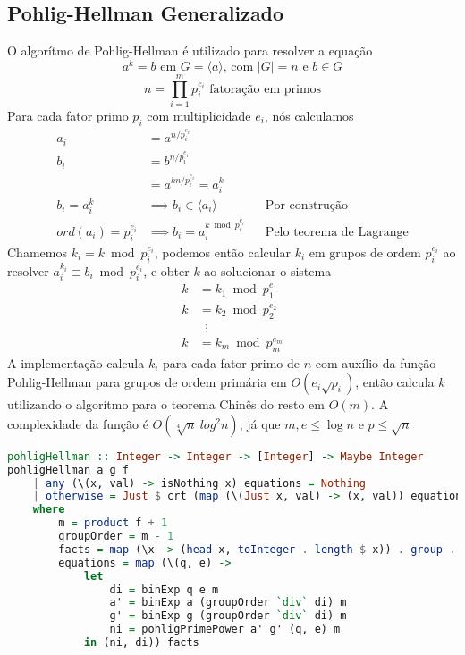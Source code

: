 \documentclass{article}
\begin{document}
\subsection{Pohlig-Hellman Generalizado}
O algorítmo de Pohlig-Hellman é utilizado para resolver a equação
$$ a^k = b \text{ em } G = \langle a \rangle\text{, com }|G| = n\text{ e }b \in G$$
$$ n = \prod_{i=1}^{m}p_i^{e_i} \text{ fatoração em primos} $$
Para cada fator primo $p_i$ com multiplicidade $e_i$, nós calculamos
\begin{align*}
    a_i &= a^{n/p_i^{e_i}}\\
    b_i &= b^{n/p_i^{e_i}}\\
        &= a^{k n/p_i^{e_i}} = a_i^k\\
    b_i = a_i^k &\implies b_i \in \langle a_i \rangle            &&\text{Por construção}\\
    ord(a_i) = p_i^{e_i} &\implies b_i = a_i^{k \bmod p_i^{e_i}} &&\text{Pelo teorema de Lagrange}
\end{align*}
Chamemos $ k_i = k \bmod p_i^{e_i} $, podemos então calcular $k_i$ em grupos de ordem $p_i^{e_i}$ ao resolver $a_i^{k_i} \equiv b_i \bmod p_i^{e_i}$, e obter $k$ ao solucionar o sistema
\begin{align*}
    k &= k_1 \bmod p_1^{e_1} \\
    k &= k_2 \bmod p_2^{e_2} \\
    &\;\;\vdots \\
    k &= k_m \bmod p_m^{e_m}
\end{align*}
A implementação calcula $k_i$ para cada fator primo de $n$ com auxílio da função Pohlig-Hellman para grupos de ordem primária em $O(e_i\sqrt{p_i})$, então calcula $k$ utilizando o algorítmo para o teorema Chinês do resto em $O(m)$.
A complexidade da função é $O(\sqrt[4]{n}\ log^2{n})$, já que $m, e \leq \log{n}$ e $p \leq \sqrt{n}$

\noindent\hspace{0.03\linewidth}
\begin{minipage}{.9\linewidth}
\begin{lstlisting}[language=haskell,caption=Pohlig Hellman]
pohligHellman :: Integer -> Integer -> [Integer] -> Maybe Integer
pohligHellman a g f
    | any (\(x, val) -> isNothing x) equations = Nothing
    | otherwise = Just $ crt (map (\(Just x, val) -> (x, val)) equations)
    where
        m = product f + 1
        groupOrder = m - 1
        facts = map (\x -> (head x, toInteger . length $ x)) . group . factorize $ groupOrder
        equations = map (\(q, e) ->
            let
                di = binExp q e m
                a' = binExp a (groupOrder `div` di) m
                g' = binExp g (groupOrder `div` di) m
                ni = pohligPrimePower a' g' (q, e) m
            in (ni, di)) facts
\end{lstlisting}
\end{minipage}
\end{document}
